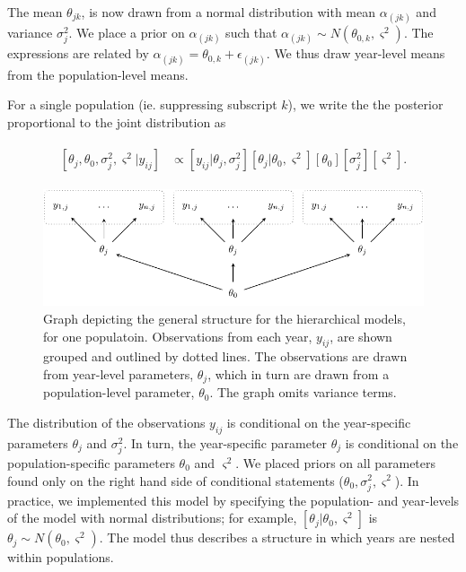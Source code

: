 \documentclass[12pt, oneside, titlepage]{article}   	%
\begin{document}
The mean $\theta_{jk}$, is now drawn from a normal distribution with mean $\alpha_{(jk)}$ and variance $\sigma^2_j$. We place a prior on $\alpha_{(jk)}$ such that $\alpha_{(jk)}\sim N(\theta_{0,k}, \varsigma^2)$. The expressions are related by $\alpha_{(jk)}=\theta_{0,k}+\epsilon_{(jk)}$. We thus draw year-level means from the population-level means. 

For a single population (ie. suppressing subscript $k$), we write the the posterior proportional to the joint distribution as

\begin{align}
  \begin{split}
  [ \theta_j , \theta_0 , \sigma_j^2 , \varsigma^2 | y_{ij} ] &  \propto [ y_{ij} | \theta_j , \sigma^2_j] [ \theta_j | \theta_0 , \varsigma^2 ] [ \theta_0 ] [ \sigma^2_j] [ \varsigma^2].
  \end{split}
\end{align}

\begin{figure}
       \includegraphics[scale=.65]{../../manuscript/figures/dag-partialpool.pdf}  
    \caption{ Graph depicting the general structure for the hierarchical models, for one populatoin. Observations from each year, $y_{ij}$, are shown grouped and outlined by dotted lines. The observations are drawn from year-level parameters, $\theta_j$, which in turn are drawn from a population-level parameter, $\theta_0$. The graph omits variance terms. }
 \label{fig:hierarchical-dag}
\end{figure}

The distribution of the observations $y_{ij}$ is conditional on the year-specific parameters $\theta_j$ and $\sigma^2_j$. In turn, the year-specific parameter $\theta_j$ is conditional on the population-specific parameters $\theta_0$ and $ \varsigma^2$. We placed priors on all parameters found only on the right hand side of conditional statements ($\theta_0, \sigma^2_j, \varsigma^2$). In practice, we implemented this model by specifying the population- and year-levels of the model with normal distributions; for example, $[ \theta_j | \theta_0 , \varsigma^2 ]$ is $\theta_j \sim N(\theta_0, \varsigma^2)$. The model thus describes a structure in which years are nested within populations.
\end{document}
